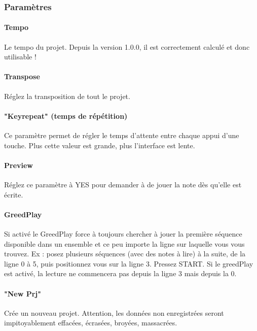 \documentclass[12pt,a4paper]{article}
\begin{document}

        \subsubsection{Paramètres}
        
        \paragraph{Tempo} Le tempo du projet. Depuis la version 1.0.0, il est correctement calculé et donc utilisable !

        \paragraph{Transpose} Réglez la transposition de tout le projet.
        
        \paragraph{"Keyrepeat" (temps de répétition)} Ce paramètre permet de régler le temps d'attente entre chaque appui d'une touche. Plus cette valeur est grande, plus l'interface est lente.

        \paragraph{Preview} Réglez ce paramètre à YES pour demander à \FAT de jouer la note dès qu'elle est écrite.

        \paragraph{GreedPlay} Si activé le GreedPlay force \FAT à toujours chercher à jouer la première séquence disponible dans un ensemble et ce peu importe la ligne sur laquelle vous vous trouvez. Ex : posez plusieurs séquences (avec des notes à lire) à la suite, de la ligne 0 à 5, puis positionnez vous sur la ligne 3. Pressez START. Si le greedPlay est activé, la lecture ne commencera pas depuis la ligne 3 mais depuis la 0.

        \paragraph{"New Prj"} Crée un nouveau projet. Attention, les données non enregistrées seront impitoyablement effacées, écrasées, broyées, massacrées.
        
\end{document}
